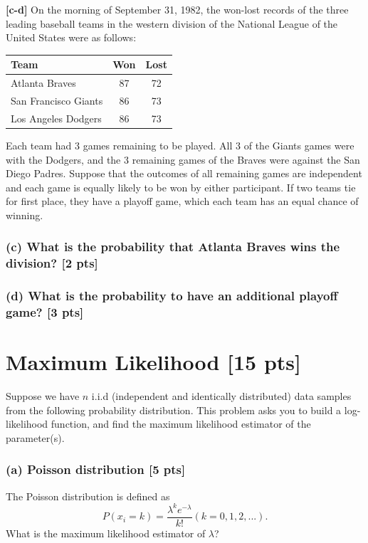 \documentclass[twoside,10pt]{article}
\begin{document}
\textbf{[c-d]} On the morning of September 31, 1982, the won-lost records of the three leading baseball teams in the western division of the National League of the United States were as follows:

\begin{table}[!h]
\centering \small
\begin{tabular}{l|c|c}
  \hline
  Team & Won & Lost\\
  \hline \hline
  Atlanta Braves & 87 & 72\\
  San Francisco Giants & 86 & 73\\
  Los Angeles Dodgers & 86 & 73\\
  \hline
\end{tabular}
\end{table}

Each team had 3 games remaining to be played. All 3 of the Giants games were with the Dodgers, and the 3 remaining games of the Braves were against the San Diego Padres. Suppose that the outcomes of all remaining games are independent and each game is equally likely to be won by either participant. If two teams tie for first place, they have a playoff game, which each team has an equal chance of winning.

\subsubsection*{(c) What is the probability that Atlanta Braves wins the division? [2 pts]}
\subsubsection*{(d) What is the probability to have an additional playoff game? [3 pts]}
\newpage

\section{Maximum Likelihood [15 pts]}

Suppose we have $n$ i.i.d (independent and identically distributed)
data samples from the following probability distribution. This
problem asks you to build a log-likelihood function, and find the
maximum likelihood estimator of the parameter(s).

\subsubsection*{(a) Poisson distribution [5 pts]}
The Poisson distribution is defined as
\begin{equation} \nonumber
P(x_i = k) = \frac{\lambda^k e^{-\lambda}}{k!} (k = 0, 1, 2, ...).
\end{equation}
What is the maximum likelihood estimator of $\lambda$?
\end{document}
